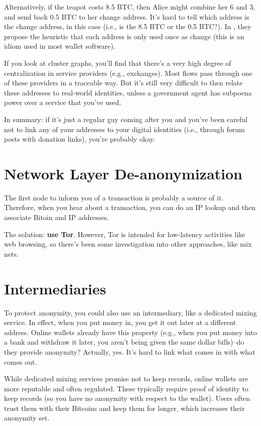 \documentclass[12pt]{article}
\begin{document}
Alternatively, if the teapot costs 8.5 BTC, then Alice might combine her 6 and 3, and send back 0.5 BTC to her change address. It's hard to tell which address is the change address, in this case (i.e., is the 8.5 BTC or the 0.5 BTC?). In , they propose the heuristic that each address is only used once as change (this is an idiom used in most wallet software).

If you look at cluster graphs, you'll find that there's a very high degree of centralization in service providers (e.g., exchanges). Most flows pass through one of these providers in a traceable way. But it's still very difficult to then relate these addresses to real-world identities, unless a government agent has subpoena power over a service that you've used.

In summary: if it's just a regular guy coming after you and you've been careful not to link any of your addresses to your digital identities (i.e., through forum posts with donation links), you're probably okay.

\section*{Network Layer De-anonymization}

The first node to inform you of a transaction is probably a source of it. Therefore, when you hear about a transaction, you can do an IP lookup and then associate Bitoin and IP addresses.

The solution: \textbf{use Tor}. However, Tor is intended for low-latency activities like web browsing, so there's been some investigation into other approaches, like mix nets.

\section*{Intermediaries}

To protect anonymity, you could also use an intermediary, like a dedicated mixing service. In effect, when you put money in, you get it out later at a different address. Online wallets already have this property (e.g., when you put money into a bank and withdraw it later, you aren't being given the same dollar bills)--do they provide anonymity? Actually, yes. It's hard to link what comes in with what comes out.

While dedicated mixing services promise not to keep records, online wallets are more reputable and often regulated. These typically require proof of identity to keep records (so you have no anonymity with respect to the wallet). Users often trust them with their Bitcoins and keep them for longer, which increases their anonymity set.
\end{document}
